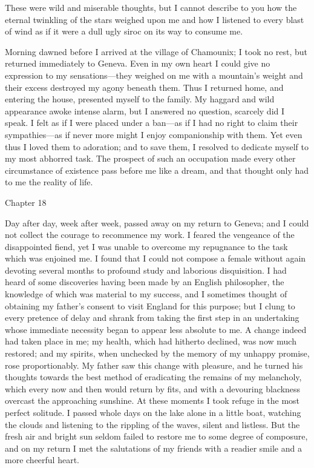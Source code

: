 \documentclass[12pt,openright]{book}
\begin{document}
These were wild and miserable thoughts, but I cannot describe to you how the eternal twinkling of the stars weighed upon me and how I listened to every blast of wind as if it were a dull ugly siroc on its way to consume me.

Morning dawned before I arrived at the village of Chamounix; I took no rest, but returned immediately to Geneva. Even in my own heart I could give no expression to my sensations—they weighed on me with a mountain’s weight and their excess destroyed my agony beneath them. Thus I returned home, and entering the house, presented myself to the family. My haggard and wild appearance awoke intense alarm, but I answered no question, scarcely did I speak. I felt as if I were placed under a ban—as if I had no right to claim their sympathies—as if never more might I enjoy companionship with them. Yet even thus I loved them to adoration; and to save them, I resolved to dedicate myself to my most abhorred task. The prospect of such an occupation made every other circumstance of existence pass before me like a dream, and that thought only had to me the reality of life.

Chapter 18

Day after day, week after week, passed away on my return to Geneva; and I could not collect the courage to recommence my work. I feared the vengeance of the disappointed fiend, yet I was unable to overcome my repugnance to the task which was enjoined me. I found that I could not compose a female without again devoting several months to profound study and laborious disquisition. I had heard of some discoveries having been made by an English philosopher, the knowledge of which was material to my success, and I sometimes thought of obtaining my father’s consent to visit England for this purpose; but I clung to every pretence of delay and shrank from taking the first step in an undertaking whose immediate necessity began to appear less absolute to me. A change indeed had taken place in me; my health, which had hitherto declined, was now much restored; and my spirits, when unchecked by the memory of my unhappy promise, rose proportionably. My father saw this change with pleasure, and he turned his thoughts towards the best method of eradicating the remains of my melancholy, which every now and then would return by fits, and with a devouring blackness overcast the approaching sunshine. At these moments I took refuge in the most perfect solitude. I passed whole days on the lake alone in a little boat, watching the clouds and listening to the rippling of the waves, silent and listless. But the fresh air and bright sun seldom failed to restore me to some degree of composure, and on my return I met the salutations of my friends with a readier smile and a more cheerful heart.
\end{document}
